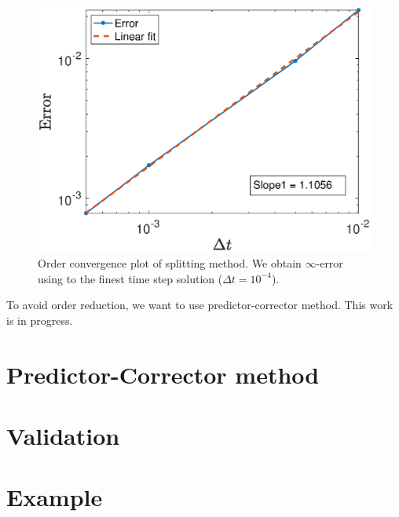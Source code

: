 \begin{figure}[ht]
	\begin{center}
	
		\includegraphics[scale=0.5]{figures/fig_infError_vel.eps}
		\caption{Order convergence plot of splitting method. We obtain $\infty$-error using to the finest time step solution ($\Delta t = 10^{-4}$).}
	\label{fig_infError_vel}
	\end{center}
\end{figure}
To avoid order reduction, we want to use predictor-corrector method. This work is in progress.
\section{Predictor-Corrector method}
\section{Validation}
\section{Example}